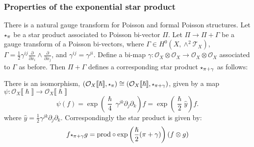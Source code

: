     
    

    \subsubsection{Properties of the exponential star product}
    
    
    There is a natural gauge transform for Poisson and formal Poisson structures. 
    Let \( \starp_{\pi}\) be a star product associated to Poisson bi-vector \( \Pi\).
    Let \( \Pi \rightarrow \Pi + \Gamma \) be a gauge transform of a Poisson bi-vectors, where \( \Gamma \in H^0(X,\wedge^2 \mathcal{T}_X)\), 
    \( \Gamma = \frac{1}{2} \gamma^{ij} \frac{\partial}{\partial x_i } \wedge \frac{\partial}{\partial x_j}\), and \( \gamma^{ij} = \gamma^{ji}\). Define a bi-map \( \gamma : \mathcal{O}_X \otimes \mathcal{O}_X \rightarrow \mathcal{O}_X \otimes \mathcal{O}_X\) associated to \( \Gamma \) as before. Then \( \Pi + \Gamma \) defines a corresponding star product \( \starp_{\pi + \gamma}\) as follows:
    
    \begin{lem}
    There is an isomorphism, \( (\mathcal{O}_X \lBrack \hslash \rBrack,
    \starp_{\pi} ) \cong ( \mathcal{O}_X \lBrack \hslash \rBrack, \starp_{\pi + \gamma} )\), given by a map 
    \(\psi : \mathcal{O}_X \lBrack \hslash \rBrack \rightarrow \mathcal{O}_X \lBrack \hslash \rBrack\)  
    \begin{equation} 
    \label{eqn:star_prod_iso}
    \psi(f) = \exp \left( \frac{\hslash}{4} \, \gamma^{jk} \partial_j \partial_k \right) f = \exp \left( \frac{\hslash}{2} \widehat{y} \right) f.
    \end{equation}
    where \( \widehat{y} = \frac{1}{2} \gamma^{jk} \partial_j \partial_k\).
    Correspondingly the star product is given by: 
    \[f \starp_{\pi + \gamma}g =  \mathrm{prod} \circ \exp  \left( \frac{\hslash}{2} ( \pi + \gamma ) \right) (f \otimes g) \]
    \end{lem}
    
